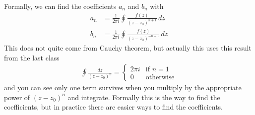Formally,
we can find the coefficients $a_n$ and $b_n$ with
\begin{align}
    a_n &=
    \frac{1}{2\pi i}
    \oint \frac{f(z)}{ {(z - z_0)}^{n + 1}}\, dz\\
    b_n &=
    \frac{1}{2\pi i}
    \oint \frac{f(z)}{ {(z - z_0)}^{-n + 1}}\, dz
\end{align}
This does not quite come from Cauchy theorem,
but actually this uses this result from the last class
\begin{align}
    \oint \frac{dz}{{(z - z_0)}^n}
    =
    \begin{cases}
        2\pi i & \text{if } n = 1\\
        0 & \text{otherwise}
    \end{cases}
\end{align}
and you can see only one term survives when you multiply by the appropriate
power of ${(z - z_0)}^n$ and integrate.
Formally this is the way to find the coefficients,
but in practice there are easier ways to find the coefficients.

